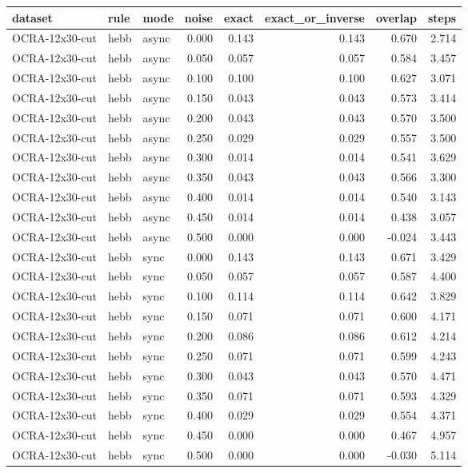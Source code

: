 \begin{tabular}{lllrrrrr}
\toprule
dataset & rule & mode & noise & exact & exact\_or\_inverse & overlap & steps \\
\midrule
OCRA-12x30-cut & hebb & async & 0.000 & 0.143 & 0.143 & 0.670 & 2.714 \\
OCRA-12x30-cut & hebb & async & 0.050 & 0.057 & 0.057 & 0.584 & 3.457 \\
OCRA-12x30-cut & hebb & async & 0.100 & 0.100 & 0.100 & 0.627 & 3.071 \\
OCRA-12x30-cut & hebb & async & 0.150 & 0.043 & 0.043 & 0.573 & 3.414 \\
OCRA-12x30-cut & hebb & async & 0.200 & 0.043 & 0.043 & 0.570 & 3.500 \\
OCRA-12x30-cut & hebb & async & 0.250 & 0.029 & 0.029 & 0.557 & 3.500 \\
OCRA-12x30-cut & hebb & async & 0.300 & 0.014 & 0.014 & 0.541 & 3.629 \\
OCRA-12x30-cut & hebb & async & 0.350 & 0.043 & 0.043 & 0.566 & 3.300 \\
OCRA-12x30-cut & hebb & async & 0.400 & 0.014 & 0.014 & 0.540 & 3.143 \\
OCRA-12x30-cut & hebb & async & 0.450 & 0.014 & 0.014 & 0.438 & 3.057 \\
OCRA-12x30-cut & hebb & async & 0.500 & 0.000 & 0.000 & -0.024 & 3.443 \\
OCRA-12x30-cut & hebb & sync & 0.000 & 0.143 & 0.143 & 0.671 & 3.429 \\
OCRA-12x30-cut & hebb & sync & 0.050 & 0.057 & 0.057 & 0.587 & 4.400 \\
OCRA-12x30-cut & hebb & sync & 0.100 & 0.114 & 0.114 & 0.642 & 3.829 \\
OCRA-12x30-cut & hebb & sync & 0.150 & 0.071 & 0.071 & 0.600 & 4.171 \\
OCRA-12x30-cut & hebb & sync & 0.200 & 0.086 & 0.086 & 0.612 & 4.214 \\
OCRA-12x30-cut & hebb & sync & 0.250 & 0.071 & 0.071 & 0.599 & 4.243 \\
OCRA-12x30-cut & hebb & sync & 0.300 & 0.043 & 0.043 & 0.570 & 4.471 \\
OCRA-12x30-cut & hebb & sync & 0.350 & 0.071 & 0.071 & 0.593 & 4.329 \\
OCRA-12x30-cut & hebb & sync & 0.400 & 0.029 & 0.029 & 0.554 & 4.371 \\
OCRA-12x30-cut & hebb & sync & 0.450 & 0.000 & 0.000 & 0.467 & 4.957 \\
OCRA-12x30-cut & hebb & sync & 0.500 & 0.000 & 0.000 & -0.030 & 5.114 \\

\end{tabular}
